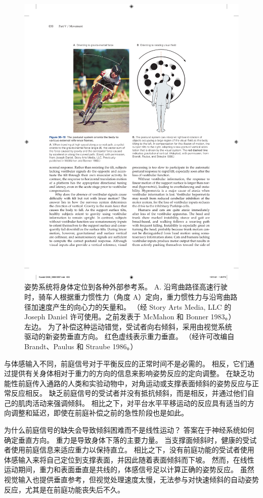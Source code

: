 \begin{figure}[htbp]
	\centering
	\includegraphics[width=0.7\linewidth]{chap36/fig_36_10}
	\caption{姿势系统将身体定位到各种外部参考系。 A. 沿弯曲路径高速行驶时，骑车人根据重力惯性力（角度 A）定向，重力惯性力与沿弯曲路径加速度产生的向心力的矢量和。 （经 Story Arts Media, LLC 的 Joseph Daniel 许可使用。之前发表于 McMahon 和 Bonner 1983。） 左边。 为了补偿这种运动错觉，受试者向右倾斜，采用由视觉系统驱动的新姿势垂直方向。 红色虚线表示重力垂直。 （经许可改编自 Brandt、Paulus 和 Straube 1986。）}
	\label{fig:36_10}
\end{figure}


与体感输入不同，前庭信号对于平衡反应的正常时间不是必需的。
相反，它们通过提供有关身体相对于重力的方向的信息来影响姿势反应的定向调整。
在缺乏功能性前庭传入通路的人类和实验动物中，对角运动或支撑表面倾斜的姿势反应与正常反应相反。
缺乏前庭信号的受试者并没有抵抗倾斜，而是相反，并通过他们自己的肌肉活动来强调倾斜。
相比之下，对平台水平平移运动的反应具有适当的方向调整和延迟，即使在前庭补偿之前的急性阶段也是如此。


为什么前庭信号的缺失会导致倾斜困难而不是线性运动？
答案在于神经系统如何确定垂直方向。
重力是导致身体下落的主要力量。
当支撑面倾斜时，健康的受试者使用前庭信息来适应重力以保持直立。
相比之下，没有前庭功能的受试者使用体感输入来将自己定位到支撑表面，并因此随着表面倾斜而下坡。
然而，在线性运动期间，重力和表面垂直是共线的，体感信号足以计算正确的姿势反应。
虽然视觉输入也提供垂直参考，但视觉处理速度太慢，无法参与对快速倾斜的自动姿势反应，尤其是在前庭功能丧失后不久。


